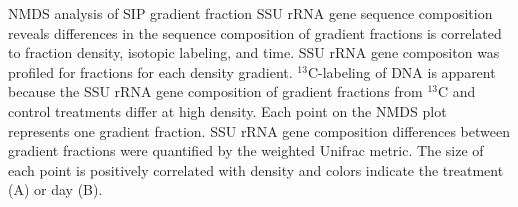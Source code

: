 NMDS analysis of SIP gradient fraction SSU rRNA gene sequence composition reveals
differences in the sequence composition of gradient fractions is correlated to
fraction density, isotopic labeling, and time. SSU rRNA gene compositon was
profiled for fractions for each density gradient. $^{13}$C-labeling of DNA is
apparent because the SSU rRNA gene composition of gradient fractions from
$^{13}$C and control treatments differ at high density. Each point on the NMDS
plot represents one gradient fraction. SSU rRNA gene composition differences
between gradient fractions were quantified by the weighted Unifrac metric. The
size of each point is positively correlated with density and colors indicate
the treatment (A) or day (B).
